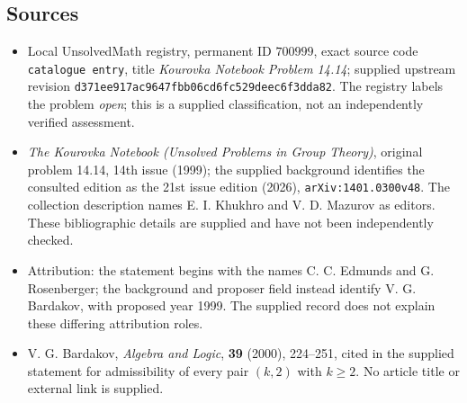 \documentclass[11pt]{article}
\begin{document}
\subsection{Sources}
\begin{itemize}
\item Local UnsolvedMath registry, permanent ID \(700999\), exact source code \texttt{catalogue entry}, title \emph{Kourovka Notebook Problem 14.14}; supplied upstream revision \texttt{d371ee917ac9647fbb06cd6fc529deec6f3dda82}. The registry labels the problem \emph{open}; this is a supplied classification, not an independently verified assessment.
\item \emph{The Kourovka Notebook (Unsolved Problems in Group Theory)}, original problem 14.14, 14th issue (1999); the supplied background identifies the consulted edition as the 21st issue edition (2026), \texttt{arXiv:1401.0300v48}. The collection description names E. I. Khukhro and V. D. Mazurov as editors. These bibliographic details are supplied and have not been independently checked.
\item Attribution: the statement begins with the names C. C. Edmunds and G. Rosenberger; the background and proposer field instead identify V. G. Bardakov, with proposed year 1999. The supplied record does not explain these differing attribution roles.
\item V. G. Bardakov, \emph{Algebra and Logic}, \textbf{39} (2000), 224--251, cited in the supplied statement for admissibility of every pair \((k,2)\) with \(k\geq2\). No article title or external link is supplied.
\end{itemize}
\end{document}
